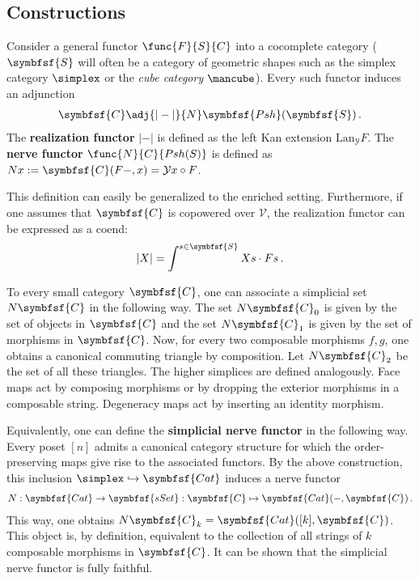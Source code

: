 \subsection{Constructions}

    \begin{construct}\label{model:nerve_and_realization}
        Consider a general functor $\func{F}{S}{C}$ into a cocomplete category ($\symbfsf{S}$ will often be a category of geometric shapes such as the simplex category $\simplex$ or the \textit{cube category} $\mbox{\mancube}$). Every such functor induces an adjunction
        \begin{gather}
            \symbfsf{C}\adj{|-|}{N}\symbfsf{Psh}(\symbfsf{S})\,.
        \end{gather}
        The \textbf{realization functor} $|-|$ is defined as the left Kan extension $\mathrm{Lan}_{\mathcal{Y}}F$. The \textbf{nerve functor} $\func{N}{C}{Psh(S)}$ is defined as $Nx:=\symbfsf{C}(F-,x)=\mathcal{Y}x\circ F$.

        This definition can easily be generalized to the enriched setting. Furthermore, if one assumes that $\symbfsf{C}$ is copowered over $\mathcal{V}$, the realization functor can be expressed as a coend:
        \begin{gather}
            |X| = \int^{s\in\symbfsf{S}}Xs\cdot Fs\,.
        \end{gather}
    \end{construct}

    \begin{example}\label{model:nerve}
        To every small category $\symbfsf{C}$, one can associate a simplicial set $N\symbfsf{C}$ in the following way. The set $N\symbfsf{C}_0$ is given by the set of objects in $\symbfsf{C}$ and the set $N\symbfsf{C}_1$ is given by the set of morphisms in $\symbfsf{C}$. Now, for every two composable morphisms $f,g$, one obtains a canonical commuting triangle by composition. Let $N\symbfsf{C}_2$ be the set of all these triangles. The higher simplices are defined analogously. Face maps act by composing morphisms or by dropping the exterior morphisms in a composable string. Degeneracy maps act by inserting an identity morphism.

        Equivalently, one can define the \textbf{simplicial nerve functor} in the following way. Every poset $[n]$ admits a canonical category structure for which the order-preserving maps give rise to the associated functors. By the above construction, this inclusion $\simplex\hookrightarrow\symbfsf{Cat}$ induces a nerve functor
        \begin{gather}
            N:\symbfsf{Cat}\rightarrow\symbfsf{sSet}:\symbfsf{C}\mapsto\symbfsf{Cat}(-,\symbfsf{C})\,.
        \end{gather}
        This way, one obtains $N\symbfsf{C}_k=\symbfsf{Cat}([k], \symbfsf{C})$. This object is, by definition, equivalent to the collection of all strings of $k$ composable morphisms in $\symbfsf{C}$. It can be shown that the simplicial nerve functor is fully faithful.
    \end{example}

